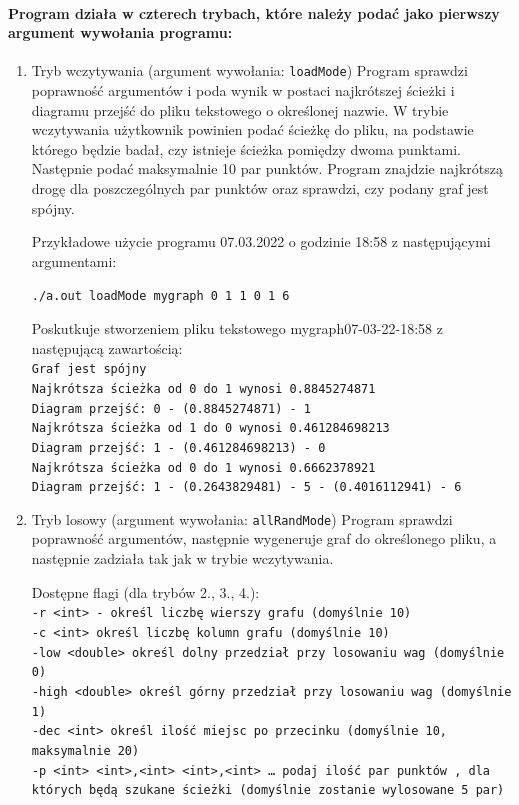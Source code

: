 \documentclass{article}
\begin{document}
\paragraph{Program działa w czterech trybach, które należy podać jako pierwszy argument wywołania programu:}
\begin{enumerate}
\item Tryb wczytywania (argument wywołania: \texttt{loadMode})
Program sprawdzi poprawność argumentów i poda wynik w postaci najkrótszej ścieżki i diagramu przejść do pliku tekstowego o określonej nazwie.
W trybie wczytywania użytkownik powinien podać ścieżkę do pliku, na podstawie którego będzie badał, czy istnieje ścieżka pomiędzy dwoma punktami. Następnie podać maksymalnie 10 par punktów. Program znajdzie najkrótszą drogę dla poszczególnych par punktów oraz sprawdzi, czy podany graf jest spójny.

Przykładowe użycie programu 07.03.2022 o godzinie 18:58 z następującymi argumentami:

\texttt{./a.out loadMode mygraph 0 1 1 0 1 6}

Poskutkuje stworzeniem pliku tekstowego mygraph07-03-22-18:58 z następującą zawartością: \\

\texttt{Graf jest spójny\\
Najkrótsza ścieżka od 0 do 1 wynosi 0.8845274871\\
Diagram przejść: 0 - (0.8845274871) - 1 \\
Najkrótsza ścieżka od 1 do 0 wynosi 0.461284698213\\
Diagram przejść: 1 - (0.461284698213) - 0\\
Najkrótsza ścieżka od 0 do 1 wynosi 0.6662378921\\
Diagram przejść: 1 - (0.2643829481) - 5 - (0.4016112941) - 6}

\item Tryb losowy (argument wywołania: \texttt{allRandMode})
Program sprawdzi poprawność argumentów, następnie wygeneruje graf do określonego pliku, a następnie zadziała tak jak w trybie wczytywania.

Dostępne flagi (dla trybów 2., 3., 4.): \\
\texttt{-r   <int> - określ liczbę wierszy grafu (domyślnie 10)\\
-c  <int>  określ liczbę kolumn grafu (domyślnie 10)\\
-low <double> określ dolny przedział przy losowaniu wag (domyślnie 0)\\
-high <double> określ górny przedział przy losowaniu wag (domyślnie 1)\\
-dec <int> określ ilość miejsc  po przecinku (domyślnie 10, maksymalnie 20)\\
-p <int>  <int>,<int>  <int>,<int> …  podaj ilość par punktów , dla których będą szukane ścieżki (domyślnie zostanie wylosowane 5 par)}



\end{enumerate}
\end{document}
